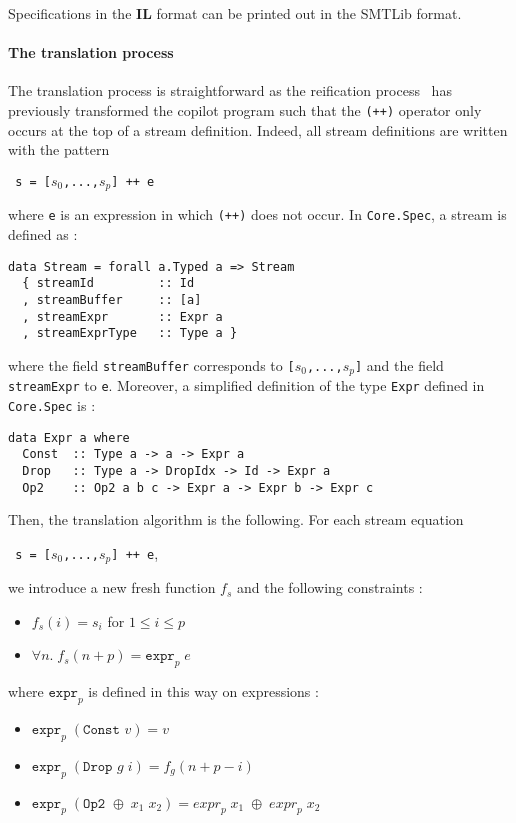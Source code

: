 \medskip

Specifications in the \textbf{IL} format can be printed out in the SMTLib format.

\paragraph{The translation process} 

The translation process is straightforward as the reification process~\cite{gill,pike-icfp-12} has previously transformed the copilot program such that the \texttt{(++)} operator only occurs at the top of a stream definition. Indeed, all stream definitions are written with the pattern
\begin{center}\texttt{ s = [$s_0$,...,$s_p$] ++ e}\end{center}
where \texttt{e} is an expression in which \texttt{(++)} does not occur. In \texttt{Core.Spec}, a stream is defined as :
\begin{lstlisting}[frame=single]
data Stream = forall a.Typed a => Stream
  { streamId         :: Id
  , streamBuffer     :: [a]
  , streamExpr       :: Expr a
  , streamExprType   :: Type a }
\end{lstlisting}
where the field \texttt{streamBuffer} corresponds to \texttt{[$s_0$,...,$s_p$]} and the field \texttt{streamExpr} to \texttt{e}. Moreover, a simplified definition of the type \texttt{Expr} defined in \texttt{Core.Spec} is :
\begin{lstlisting}[frame=single]
data Expr a where
  Const  :: Type a -> a -> Expr a
  Drop   :: Type a -> DropIdx -> Id -> Expr a
  Op2    :: Op2 a b c -> Expr a -> Expr b -> Expr c
\end{lstlisting}
Then, the translation algorithm is the following. For each stream equation \begin{center}\texttt{ s = [$s_0$,...,$s_p$] ++ e},\end{center}we introduce a new fresh function $f_s$ and the following constraints :

\begin{itemize}
\item $f_s(i) = s_i$ \quad for $1 \leq i \leq p$
\item $\forall n . \; f_s(n + p) = \texttt{expr}_p \; e$
\end{itemize}
where $\texttt{expr}_p$ is defined in this way on expressions :
\begin{itemize}
\item $\texttt{expr}_p \; (\texttt{Const } v) = v$
\item $\texttt{expr}_p \; (\texttt{Drop } g \; i) = f_g(n + p - i)$
\item $\texttt{expr}_p \; (\texttt{Op2 } \oplus \; x_1 \; x_2) =  {expr}_p \; x_1 \; \oplus \; {expr}_p \; x_2 $
\end{itemize}


